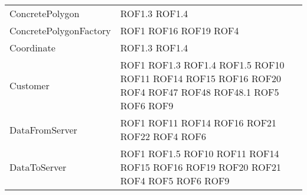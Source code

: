 \begin{longtable}{p{5cm}!{\VRule[1pt]}p{2.5cm}}
		ConcretePolygon & ROF1.3 \newline ROF1.4\\
		ConcretePolygonFactory & ROF1 \newline ROF16 \newline ROF19 \newline ROF4\\
		Coordinate & ROF1.3 \newline ROF1.4\\
		Customer & ROF1 \newline ROF1.3 \newline ROF1.4 \newline ROF1.5 \newline ROF10 \newline ROF11 \newline ROF14 \newline ROF15 \newline ROF16 \newline ROF20 \newline ROF4 \newline ROF47 \newline ROF48 \newline ROF48.1 \newline ROF5 \newline ROF6 \newline ROF9\\
		DataFromServer & ROF1 \newline ROF11 \newline ROF14 \newline ROF16 \newline ROF21 \newline ROF22 \newline ROF4 \newline ROF6\\
		DataToServer & ROF1 \newline ROF1.5 \newline ROF10 \newline ROF11 \newline ROF14 \newline ROF15 \newline ROF16 \newline ROF19 \newline ROF20 \newline ROF21 \newline ROF4 \newline ROF5 \newline ROF6 \newline ROF9\\

\end{longtable}
